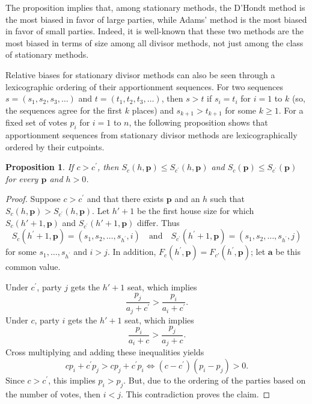 \documentclass[pdflatex,sn-mathphys-num]{sn-jnl}
\theoremstyle{thmstyleone}%
\newtheorem{proposition}{Proposition}%
\theoremstyle{thmstyletwo}%
\theoremstyle{thmstylethree}%
\begin{document}
The proposition implies that, among stationary methods, the D'Hondt method is the most biased in favor of large parties, while Adams' method is the most biased in favor of small parties. Indeed, it is well-known that these two methods are the most biased in terms of size among all divisor methods, not just among the class of stationary methods.  

Relative biases for stationary divisor methods can also be seen through a lexicographic ordering of their apportionment sequences.  For two sequences $s = (s_1, s_2, s_3, \ldots)$ and $t = (t_1, t_2, t_3, \ldots)$, then $s > t$ if $s_i = t_i$ for $i = 1$ to $k$ (so, the sequences agree for the first $k$ places) and $s_{k+1} > t_{k+1}$ for some $k \ge 1$.  For a fixed set of votes $p_i$ for $i= 1 $ to $n$, the following proposition shows that apportionment sequences from stationary divisor methods are lexicographically ordered by their cutpoints.

\begin{proposition}\label{ordering} If $c> c^\prime$, then $S_c(h,  \mathbf p) \le S_{c^\prime}(h, \mathbf p)$ and $S_c( \mathbf p) \le S_{c^\prime}(\mathbf p)$ for every $\mathbf p$ and $h>0$. 
 \end{proposition}

\begin{proof}
Suppose $c > c^\prime$ and that there exists $\mathbf p$ and an $h$ such that $S_c(h,  \mathbf p) > S_{c^\prime}(h, \mathbf p)$. Let  $h'+1$ be the first house size for which $S_c(h' + 1,  \mathbf p)$ and $S_{c^\prime}(h' + 1, \mathbf p)$ differ. Thus  
$$S_c(h^\prime +1, \mathbf p) = (s_1, s_2, \ldots, s_{h^\prime}, i) \quad \mbox{and} \quad S_{c^\prime}(h^\prime+1, \mathbf p)  = (s_1, s_2, \ldots, s_{h^\prime}, j)$$ 
 for some $s_1, \ldots, s_{h^\prime}$ and $i > j$.  In addition,  $F_c(h^\prime, \mathbf p) = F_{c'}(h^\prime, \mathbf p)$; let $\mathbf a$ be this common value. 

 Under $c^\prime$, party $j$ gets the $h'+1$ seat, which implies $$\frac{p_j}{a_j+c^\prime} > \frac{p_i}{a_i+c^\prime}.$$ Under $c$, party $i$ gets the $h'+1$ seat, which implies $$\frac{p_i}{a_i+c} > \frac{p_j}{a_j+c}.$$ Cross multiplying and adding these inequalities yields 
 $$cp_i+c^\prime p_j > cp_j+c^\prime p_i \iff (c-c^\prime)(p_i-p_j)>0.$$
Since $c>c^\prime$, this implies $p_i>p_j$.  But, due to the ordering of the parties based on the number of votes, then $i<j$.  This contradiction proves the claim.   
\end{proof}
\end{document}
